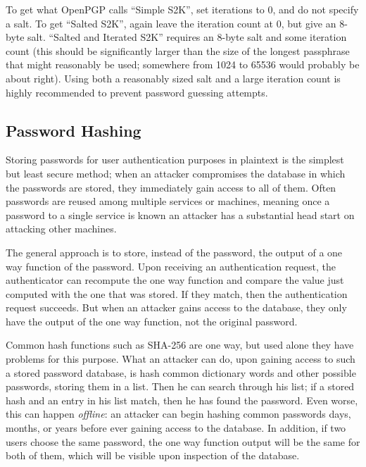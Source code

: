 \documentclass{article}
\begin{document}
To get what OpenPGP calls ``Simple S2K'', set iterations to 0, and do
not specify a salt. To get ``Salted S2K'', again leave the iteration
count at 0, but give an 8-byte salt. ``Salted and Iterated S2K''
requires an 8-byte salt and some iteration count (this should be
significantly larger than the size of the longest passphrase that
might reasonably be used; somewhere from 1024 to 65536 would probably
be about right). Using both a reasonably sized salt and a large
iteration count is highly recommended to prevent password guessing
attempts.

\subsection{Password Hashing}

Storing passwords for user authentication purposes in plaintext is the
simplest but least secure method; when an attacker compromises the
database in which the passwords are stored, they immediately gain
access to all of them. Often passwords are reused among multiple
services or machines, meaning once a password to a single service is
known an attacker has a substantial head start on attacking other
machines.

The general approach is to store, instead of the password, the output
of a one way function of the password. Upon receiving an
authentication request, the authenticator can recompute the one way
function and compare the value just computed with the one that was
stored. If they match, then the authentication request succeeds. But
when an attacker gains access to the database, they only have the
output of the one way function, not the original password.

Common hash functions such as SHA-256 are one way, but used alone they
have problems for this purpose. What an attacker can do, upon gaining
access to such a stored password database, is hash common dictionary
words and other possible passwords, storing them in a list. Then he
can search through his list; if a stored hash and an entry in his list
match, then he has found the password. Even worse, this can happen
\emph{offline}: an attacker can begin hashing common passwords days,
months, or years before ever gaining access to the database. In
addition, if two users choose the same password, the one way function
output will be the same for both of them, which will be visible upon
inspection of the database.
\end{document}
